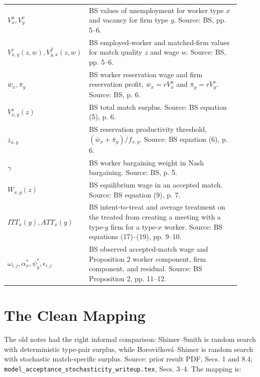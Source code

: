 \documentclass[11pt]{article}
\begin{document}
\begin{center}
\begin{tabular}{>{\raggedright\arraybackslash}p{0.24\linewidth}
                >{\raggedright\arraybackslash}p{0.68\linewidth}}
$V_x^u,V_y^v$ & BS values of unemployment for worker type $x$ and vacancy for firm type $y$. Source: BS, pp. 5--6. \\
$V^e_{x,y}(z,w),V^f_{y,x}(z,w)$ & BS employed-worker and matched-firm values for match quality $z$ and wage $w$. Source: BS, pp. 5--6. \\
$\bar w_x,\bar\pi_y$ & BS worker reservation wage and firm reservation profit, $\bar w_x=rV_x^u$ and $\bar\pi_y=rV_y^v$. Source: BS, p. 6. \\
$V^s_{x,y}(z)$ & BS total match surplus. Source: BS equation (5), p. 6. \\
$\bar z_{x,y}$ & BS reservation productivity threshold, $(\bar w_x+\bar\pi_y)/f_{x,y}$. Source: BS equation (6), p. 6. \\
$\gamma$ & BS worker bargaining weight in Nash bargaining. Source: BS, p. 5. \\
$W_{x,y}(z)$ & BS equilibrium wage in an accepted match. Source: BS equation (9), p. 7. \\
$ITT_x(y),ATT_x(y)$ & BS intent-to-treat and average treatment on the treated from creating a meeting with a type-$y$ firm for a type-$x$ worker. Source: BS equations (17)--(19), pp. 9--10. \\
$\omega_{i,j},\alpha_x^*,\psi_y^*,\epsilon_{i,j}$ & BS observed accepted-match wage and Proposition 2 worker component, firm component, and residual. Source: BS Proposition 2, pp. 11--12. \\
\bottomrule
\end{tabular}
\end{center}

\section{The Clean Mapping}

The old notes had the right informal comparison: Shimer--Smith is random search
with deterministic type-pair surplus, while Borovi\v{c}kov\'a--Shimer is random
search with stochastic match-specific surplus. Source: prior result PDF, Secs.
1 and 8.4; \texttt{model\_acceptance\_stochasticity\_writeup.tex}, Secs. 3--4.
The mapping is:
\end{document}
